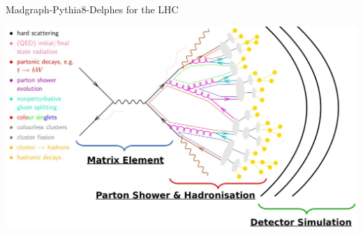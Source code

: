 \documentclass{../bredelebeamer}
\begin{document}
\begin{frame}{Madgraph-Pythia8-Delphes for the LHC}
	\begin{center}
		\includegraphics[width=.99\linewidth]{Madgraph.png}
	\end{center}
\end{frame}
\end{document}
